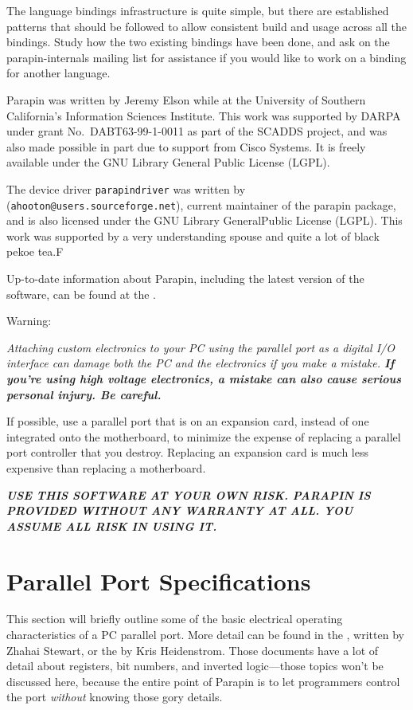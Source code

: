 \documentclass{article}
\begin{document}
The language bindings infrastructure is quite simple, but there are
established patterns that should be followed to allow consistent
build and usage across all the bindings.  Study
how the two existing bindings have been done, and ask on the
parapin-internals mailing list for assistance if you would like to
work on a binding for another language.

    
Parapin was written by Jeremy
  Elson
while at the University of Southern California's Information Sciences
Institute.  This work was supported by DARPA under grant No.\ 
DABT63-99-1-0011 as part of the SCADDS project, and was also made
possible in part due to support from Cisco Systems.  It is freely
available under the GNU Library General Public License (LGPL).

The device driver {\tt parapindriver} was written by
 ({\tt ahooton@users.sourceforge.net}), current maintainer of the parapin package, and is
also licensed under the GNU Library GeneralPublic License (LGPL).
This work was supported by a very understanding spouse and quite a lot
of black pekoe tea.F

Up-to-date information about Parapin, including the latest version of
the software, can be found at the \htmladdnormallinkfoot{Parapin Home
  Page}{http://parapin.sourceforge.net/}.

{\Huge Warning:}

{\em Attaching custom electronics to your PC using the parallel port
as a digital I/O interface can damage both the PC and the electronics
if you make a mistake. {\bf If you're using high voltage electronics,
a mistake can also cause serious personal injury.  Be careful.}}

If possible, use a parallel port that is on an expansion card, instead of
one integrated onto the motherboard, to minimize the expense of
replacing a parallel port controller that you destroy.  Replacing an 
expansion card is much less expensive than replacing a motherboard.

{\em {\bf USE THIS SOFTWARE AT YOUR OWN RISK.  PARAPIN IS PROVIDED WITHOUT ANY WARRANTY AT ALL.  YOU ASSUME ALL RISK IN USING IT.}}


\section{Parallel Port Specifications}
\label{specs}

This section will briefly outline some of the basic electrical
operating characteristics of a PC parallel port.  More detail can be
found in the , written by
Zhahai Stewart, or the
by Kris Heidenstrom.  Those
documents have a lot of detail about registers, bit numbers, and
inverted logic---those topics won't be discussed here, because the
entire point of Parapin is to let programmers control the port {\em
without} knowing those gory details.
\end{document}
